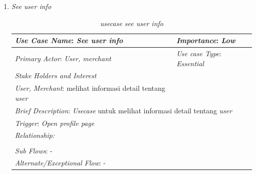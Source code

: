 \documentclass[a4paper]{article}
\begin{document}
\begin{enumerate}
\begin{enumerate}
        \newpage
        \item \textit{See user info}
        \begin{table}[h]
            \centering
            \caption{\textit{usecase see user info} }
            \begin{tabular}{|lll}
            \hline
            \multicolumn{1}{|l|}{\textit{Use Case Name}: \textit{See user info}}             & \multicolumn{2}{l|}{\textit{Importance}: \textit{Low}}   \\ \hline
            \multicolumn{1}{|l|}{\textit{Primary Actor}: \textit{User, merchant}}             & \multicolumn{2}{l|}{\textit{Use case Type}: \textit{Essential}} \\ \hline
            \multicolumn{1}{|l|}{\textit{Stake Holders and Interest}} &                               &                               \\ \cline{1-1}
            \multicolumn{1}{|l|}{\textit{User, Merchant}: melihat informasi detail tentang \textit{user}}                                                     &                               &                               \\ \hline
            \multicolumn{3}{|l|}{\textit{Brief Description}: \textit{Usecase} untuk melihat informasi detail tentang \textit{user}}                                                                         \\ \hline
            \multicolumn{3}{|l|}{\textit{Trigger}: \textit{Open profile page}}                                                                                   \\ \hline
            \multicolumn{3}{|l|}{\textit{Relationship:}}                                                                              \\ \hline
            \multicolumn{3}{|l|}{}                                                                                                                     \\ \hline
            \multicolumn{3}{|l|}{\textit{Sub Flows}: -}                                                                                 \\ \hline
            \multicolumn{3}{|l|}{\textit{Alternate/Exceptional Flow}: -}                                                                \\ \hline
            \end{tabular}
        \end{table}



\end{enumerate}
\end{enumerate}
\end{document}
